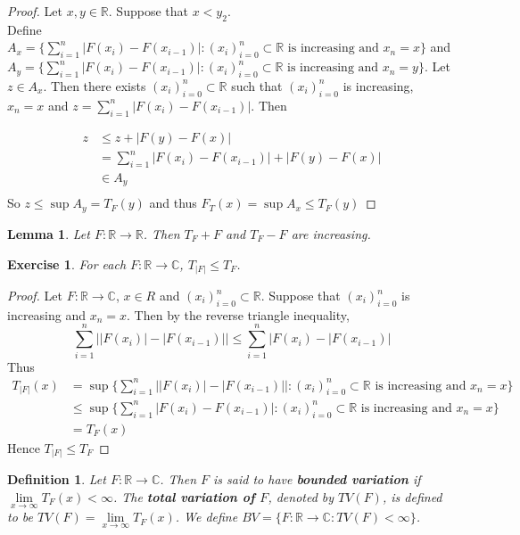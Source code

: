 \documentclass[12pt]{amsart}
\newtheorem{lem}[thm]{Lemma}
\newtheorem{defn}[thm]{Definition}
\newtheorem{ex}[thm]{Exercise}
\newcommand{\C}{\mathbb{C}}
\newcommand{\R}{\mathbb{R}}
\begin{document}
\begin{proof}
Let $x,y \in \R$. Suppose that $x<y_2$. \\Define  $A_x = \big \{\sum_{i=1}^{n}|F(x_{i}) - F(x_{i-1})|: (x_i)_{i=0}^n \subset \R \text{ is increasing and } x_n=x  \big \}$ and \\$A_y = \big \{\sum_{i=1}^{n}|F(x_{i}) - F(x_{i-1})|: (x_i)_{i=0}^n \subset \R \text{ is increasing and } x_n=y  \big \}$. Let $z \in A_x$. Then there exists $(x_i)_{i=0}^n \subset \R$ such that $(x_i)_{i=0}^n$ is increasing,\\ $x_n=x$ and $z = \sum_{i=1}^n |F(x_{i}) - F(x_{i-1})|$. Then

\begin{align*}
z 
& \leq z+|F(y)-F(x)|\\
&= \sum_{i=1}^n |F(x_{i}) - F(x_{i-1})| + |F(y)-F(x)|\\
& \in A_y\\
\end{align*} 
So $z \leq \sup A_y = T_F(y) $ and thus $F_T(x)  = \sup A_x \leq T_F(y)$
\end{proof}

\begin{lem}
Let $F:\R \rightarrow \R$. Then $T_F+F$ and $T_F-F$ are increasing.
\end{lem}

\begin{ex}
For each $F:\R \rightarrow \C$, $T_{|F|} \leq T_F$.
\end{ex}

\begin{proof}
Let $F:\R \rightarrow \C$, $x \in R$ and $(x_i)_{i=0}^n \subset \R$. Suppose that $(x_i)_{i=0}^n$ is increasing and $x_n=x$. Then by the reverse triangle inequality, $$ \sum_{i=1}^n\big||F(x_i)|-|F(x_{i-1})|\big|
\leq \sum_{i=1}^n\big|F(x_i)-|F(x_{i-1})\big|$$
Thus 
\begin{align*}
T_{|F|}(x) 
&= \sup\bigg \{\sum_{i=1}^{n}\big||F(x_{i})| - |F(x_{i-1})|\big|: (x_i)_{i=0}^n \subset \R \text{ is increasing and } x_n=x  \bigg \} \\
& \leq \sup\bigg \{\sum_{i=1}^{n}|F(x_{i}) - F(x_{i-1})|: (x_i)_{i=0}^n \subset \R \text{ is increasing and } x_n=x  \bigg \} \\
&= T_F(x)
\end{align*}
Hence $T_{|F|} \leq T_F$
\end{proof}

\begin{defn}
Let $F:\R \rightarrow \C$. Then $F$ is said to have \textbf{bounded variation} if $\lim \limits_{x \rightarrow \infty}T_F(x)<\infty$. The \textbf{total variation of $F$}, denoted by $TV(F)$, is defined to be $TV(F) = \lim\limits_{x\rightarrow \infty}T_F(x)$.
We define $BV = \{F:\R \rightarrow \C: TV(F)<\infty \}$.
\end{defn}
\end{document}

